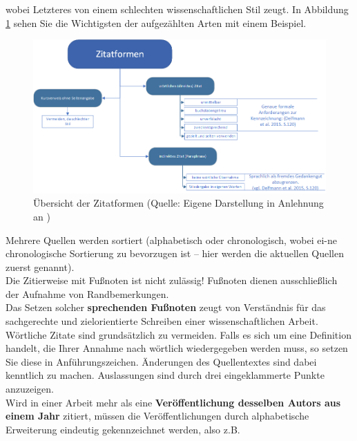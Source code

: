 \documentclass[%
	BCOR=8.25mm,         %
	DIV=12,              %
	parskip=half,		 %
	toc=bibliography,	 %
	headsepline=on,      %
	oneside,
	toc=listof,
	toc=index,
	enabledeprecatedfontcommands,
	]{scrbook}
\begin{document}
wobei Letzteres von einem schlechten wissenschaftlichen Stil zeugt. In Abbildung \ref{fig:zitatformen} sehen Sie die Wichtigsten der aufgezählten Arten mit einem Beispiel.\\
\begin{figure}[h!]
	\centering
	\includegraphics[width=1\textwidth]{img/Zitatformen}
	\caption{\"Ubersicht der Zitatformen (Quelle: Eigene Darstellung in Anlehnung an \cite[S. 89]{prexl2016digitalen})}
	\label{fig:zitatformen}
\end{figure}

Mehrere Quellen werden sortiert (alphabetisch oder chronologisch, wobei ei-ne chronologische Sortierung zu bevorzugen ist – hier werden die aktuellen Quellen zuerst genannt).\\
Die Zitierweise mit Fußnoten ist nicht zul\"assig! Fußnoten dienen ausschlie{\ss}lich der Aufnahme von Randbemerkungen.\\
Das Setzen solcher \textbf{sprechenden Fußnoten} zeugt von Verst\"andnis für das sachgerechte und zielorientierte Schreiben einer wissenschaftlichen Arbeit.\\
W\"ortliche Zitate sind grunds\"atzlich zu vermeiden. Falls es sich um eine Definition handelt, die Ihrer Annahme nach w\"ortlich wiedergegeben werden muss, so setzen Sie diese in Anf\"uhrungszeichen. \"Anderungen des Quellentextes sind dabei kenntlich zu machen. Auslassungen sind durch drei eingeklammerte Punkte anzuzeigen.\\
Wird in einer Arbeit mehr als eine \textbf{Ver\"offentlichung desselben Autors aus einem Jahr} zitiert, m\"ussen die Ver\"offentlichungen durch alphabetische Erweiterung eindeutig gekennzeichnet werden, also z.B. 
\end{document}
